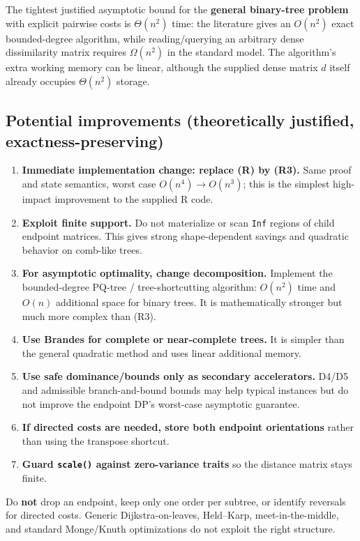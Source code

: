 \documentclass[11pt]{article}
\theoremstyle{plain}
\begin{document}
The tightest justified asymptotic bound for the \textbf{general binary-tree
problem} with explicit pairwise costs is \(\Theta(n^2)\) time: the literature
gives an \(O(n^2)\) exact bounded-degree algorithm, while reading/querying an
arbitrary dense dissimilarity matrix requires \(\Omega(n^2)\) in the standard
model. The algorithm's extra working memory can be linear, although the
supplied dense matrix \(d\) itself already occupies \(\Theta(n^2)\) storage.

\subsection{Potential improvements (theoretically justified,
exactness-preserving)}

\begin{enumerate}[label=\arabic*.]
\item \textbf{Immediate implementation change: replace (R) by (R3).} Same proof
  and state semantics, worst case \(O(n^4)\to O(n^3)\); this is the simplest
  high-impact improvement to the supplied R code.
\item \textbf{Exploit finite support.} Do not materialize or scan \texttt{Inf}
  regions of child endpoint matrices. This gives strong shape-dependent savings
  and quadratic behavior on comb-like trees.
\item \textbf{For asymptotic optimality, change decomposition.} Implement the
  bounded-degree PQ-tree / tree-shortcutting algorithm: \(O(n^2)\) time and
  \(O(n)\) additional space for binary trees. It is mathematically stronger but
  much more complex than (R3).
\item \textbf{Use Brandes for complete or near-complete trees.} It is simpler
  than the general quadratic method and uses linear additional memory.
\item \textbf{Use safe dominance/bounds only as secondary accelerators.}
  D4/D5 and admissible branch-and-bound bounds may help typical instances but
  do not improve the endpoint DP's worst-case asymptotic guarantee.
\item \textbf{If directed costs are needed, store both endpoint orientations}
  rather than using the transpose shortcut.
\item \textbf{Guard \texttt{scale()} against zero-variance traits} so the
  distance matrix stays finite.
\end{enumerate}

Do \textbf{not} drop an endpoint, keep only one order per subtree, or identify
reversals for directed costs. Generic Dijkstra-on-leaves, Held--Karp,
meet-in-the-middle, and standard Monge/Knuth optimizations do not exploit the
right structure.
\end{document}

